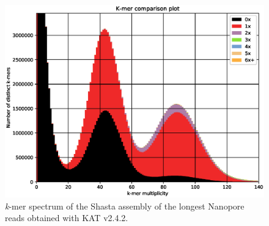     \begin{figure}[ht]
    \centering
     \includegraphics[width=13.5cm]{fig/benchmark/kat_comp_shasta_min30000_1-main.mx.spectra-cn.eps}
   \caption{\textit{k}-mer spectrum of the Shasta assembly of the longest Nanopore reads obtained with KAT v2.4.2.}
   \label{fig:kat_shasta_min30000}
 \end{figure}
 
